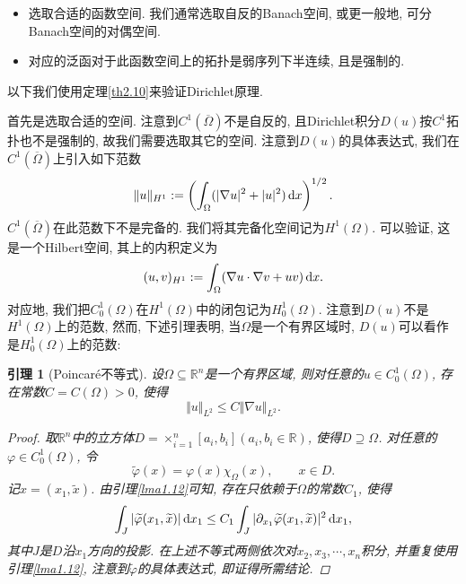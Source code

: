 \documentclass[12pt,a4paper]{article}
\newtheorem{lemma}[theorem]{引理}
\begin{document}
\begin{itemize}
    \item 选取合适的函数空间. 我们通常选取自反的Banach空间, 或更一般地, 可分Banach空间的对偶空间.
    \item 对应的泛函对于此函数空间上的拓扑是弱序列下半连续, 且是强制的.
\end{itemize}

以下我们使用定理\ref{th2.10}来验证Dirichlet原理.

首先是选取合适的空间. 注意到$C^1(\overline{\Omega})$不是自反的, 且Dirichlet积分$D(u)$按$C^1$拓扑也不是强制的, 故我们需要选取其它的空间.
注意到$D(u)$的具体表达式, 我们在$C^1(\overline{\Omega})$上引入如下范数 
\begin{equation*}
    \Vert u \Vert_{H^1} := \left(\int_{\Omega}(|\nabla u|^2 + |u|^2) \,{\rm d}x\right)^{1/2}.
\end{equation*}
$C^1(\overline{\Omega})$在此范数下不是完备的. 我们将其完备化空间记为$H^1(\Omega)$.
可以验证, 这是一个Hilbert空间, 其上的内积定义为 
\begin{equation*}
    (u, v)_{H^1} := \int_{\Omega}(\nabla u \cdot \nabla v + uv) \,{\rm d}x. 
\end{equation*}
对应地, 我们把$C_0^1(\Omega)$在$H^1(\Omega)$中的闭包记为$H_0^1(\Omega)$. 注意到$D(u)$不是$H^1(\Omega)$上的范数, 然而, 下述引理表明, 当$\Omega$是一个有界区域时, $D(u)$可以看作是$H_0^1(\Omega)$上的范数:

\begin{lemma}[Poincaré不等式]
    设$\Omega \subseteq \mathbb{R}^n$是一个有界区域, 则对任意的$u \in C_0^1(\Omega)$, 存在常数$C = C(\Omega) > 0$, 使得 
    \begin{equation*}
        \Vert u \Vert_{L^2} \leq C\Vert \nabla u \Vert_{L^2}.
    \end{equation*}
    \begin{proof}
        取$\mathbb{R}^n$中的立方体$D = \times_{i = 1}^n[a_i, b_i] (a_i, b_i \in \mathbb{R})$, 使得$D \supseteq \Omega$. 对任意的$\varphi \in C_0^1(\Omega)$, 令 
        \begin{equation*}
            \widetilde{\varphi}(x) = \varphi(x)\chi_{\Omega}(x), \qquad x \in D.
        \end{equation*}
        记$x = (x_1, \widetilde{x})$. 由引理\ref{lma1.12}可知, 存在只依赖于$\Omega$的常数$C_1$, 使得
        \begin{equation*}
            \int_J |\widetilde{\varphi}(x_1, \widetilde{x})| \,{\rm d}x_1 \leq C_1\int_J|\partial_{x_1}\widetilde{\varphi}(x_1, \widetilde{x})|^2 \,{\rm d}x_1,
        \end{equation*}
        其中$J$是$D$沿$x_1$方向的投影. 在上述不等式两侧依次对$x_2, x_3, \cdots, x_n$积分, 并重复使用引理\ref{lma1.12}, 注意到$\widetilde{\varphi}$的具体表达式, 即证得所需结论.
    \end{proof}
\end{lemma}
\end{document}
